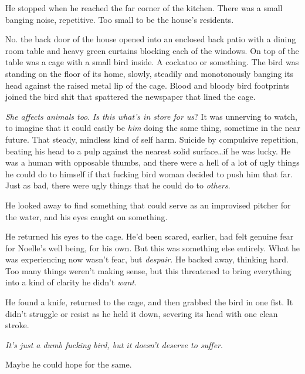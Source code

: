He stopped when he reached the far corner of the kitchen.  There was a small banging noise, repetitive.  Too small to be the house's residents.



No.  the back door of the house opened into an enclosed back patio with a dining room table and heavy green curtains blocking each of the windows.  On top of the table was a cage with a small bird inside.  A cockatoo or something.  The bird was standing on the floor of its home, slowly, steadily and monotonously banging its head against the raised metal lip of the cage.  Blood and bloody bird footprints joined the bird shit that spattered the newspaper that lined the cage.



\emph{She affects animals too}.  \emph{Is this what's in store for us}?  It was unnerving to watch, to imagine that it could easily be \emph{him} doing the same thing, sometime in the near future.  That steady, mindless kind of self harm.  Suicide by compulsive repetition, beating his head to a pulp against the nearest solid surface\ldots if he was lucky.  He was a human with opposable thumbs, and there were a hell of a lot of ugly things he could do to himself if that fucking bird woman decided to push him that far.  Just as bad, there were ugly things that he could do to \emph{others}.



He looked away to find something that could serve as an improvised pitcher for the water, and his eyes caught on something.



He returned his eyes to the cage.  He'd been scared, earlier, had felt genuine fear for Noelle's well being, for his own.  But this was something else entirely.  What he was experiencing now wasn't fear, but \emph{despair}.  He backed away, thinking hard.  Too many things weren't making sense, but this threatened to bring everything into a kind of clarity he didn't \emph{want}.



He found a knife, returned to the cage, and then grabbed the bird in one fist.  It didn't struggle or resist as he held it down, severing its head with one clean stroke.



\emph{It's just a dumb fucking bird, but it doesn't deserve to suffer}.



Maybe he could hope for the same.



